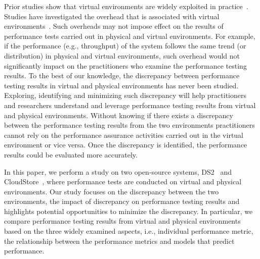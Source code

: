 \documentclass[smallextended]{svjour3}       %
\begin{document}
Prior studies show that virtual environments are widely exploited in practice~\cite{Cito:2015:MCA:2786805.2786826,Nguyen:2012:ADP:2188286.2188344,xiong2013vperfguard}. Studies have investigated the overhead that is associated with virtual environments~\cite{menon2005diagnosing}. Such overheads may not impose effect on the results of performance tests carried out in physical and virtual environments. For example, if the performance (e.g., throughput) of the system follows the same trend (or distribution) in physical and virtual environments, such overhead would not significantly impact on the practitioners who examine the performance testing results. To the best of our knowledge, the discrepancy between performance testing results in virtual and physical environments has never been studied. Exploring, identifying and minimizing such discrepancy will help practitioners and researchers understand and leverage performance testing results from virtual and physical environments. Without knowing if there exists a discrepancy between the performance testing results from the two environments practitioners cannot rely on the performance assurance activities carried out in the virtual environment or vice versa. Once the discrepancy is identified, the performance results could be evaluated more accurately.

In this paper, we perform a study on two open-source systems, DS2~\cite{delldvd} and CloudStore~\cite{cloudstore}, where performance tests are conducted on virtual and physical environments. Our study focuses on the discrepancy between the two environments, the impact of discrepancy on performance testing results and highlights potential opportunities to minimize the discrepancy. In particular, we compare performance testing results from virtual and physical environments based on the three widely examined aspects, i.e., individual performance metric, the relationship between the performance metrics and models that predict performance. 
\end{document}
